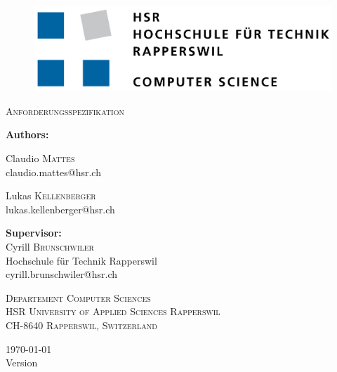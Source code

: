 \begin{titlepage}
	\centering
	\begin{figure}
		\centering
		\includegraphics[width=0.7\linewidth]{./assets/logo/hsr.png}  	
	\end{figure}

	{\scshape\Large Anforderungsspezifikation\par}
	\vspace{1.2cm}
	{\huge\bfseries \TITLE\par}
	\vspace{1.2cm}

	{\Large\textbf{Authors:} \\\vspace{0.2cm}}
	{\Large Claudio \textsc{Mattes} \\\small claudio.mattes@hsr.ch \par\vspace{0.2cm}
	\Large Lukas \textsc{Kellenberger} \\\small lukas.kellenberger@hsr.ch}

	\vspace{0.6cm}
	{\Large\textbf{Supervisor:} \\\vspace{0.2cm}}
	Cyrill \textsc{Brunschwiler}  \\ {\small Hochschule für Technik Rapperswil} \\\small cyrill.brunschwiler@hsr.ch \\

	\vspace{0.6cm}

	\vfill
	{\scshape\scriptsize Departement Computer Sciences \\ HSR University of Applied Sciences Rapperswil \\ CH-8640 Rapperswil, Switzerland \par}

	\vfill

    {\large \today \\ \small Version \VERSION}
\end{titlepage}